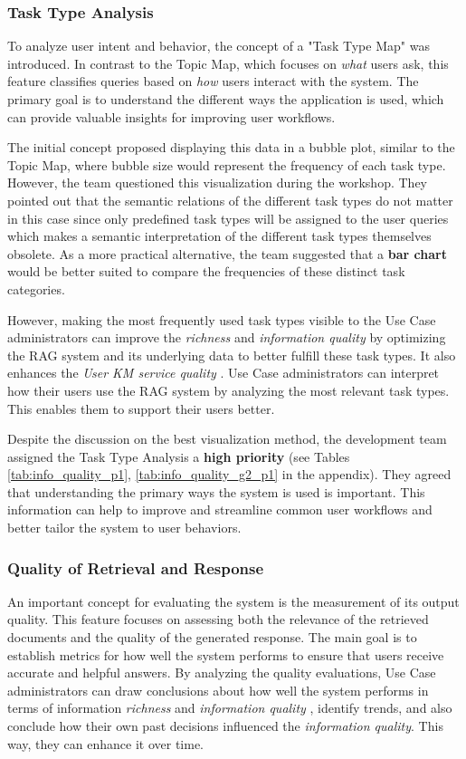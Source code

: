 \documentclass[
	english,
	ruledheaders=section,%
	class=report,%
	thesis={type=bachelor},%
	accentcolor=1b,%
	custommargins=true,%
	marginpar=false,%
	parskip=half-,%
	fontsize=11pt,%
	DIV=14,
]{tudapub}
\begin{document}
\subsubsection{Task Type Analysis}
To analyze user intent and behavior, the concept of a "Task Type Map" was introduced. In contrast to the Topic Map, which focuses on \textit{what} users ask, this feature classifies queries based on \textit{how} users interact with the system. The primary goal is to understand the different ways the application is used, which can provide valuable insights for improving user workflows.

The initial concept proposed displaying this data in a bubble plot, similar to the Topic Map, where bubble size would represent the frequency of each task type. However, the team questioned this visualization during the workshop. They pointed out that the semantic relations of the different task types do not matter in this case since only predefined task types will be assigned to the user queries which makes a semantic interpretation of the different task types themselves obsolete. As a more practical alternative, the team suggested that a \textbf{bar chart} would be better suited to compare the frequencies of these distinct task categories.

However, making the most frequently used task types visible to the Use Case administrators can improve the \textit{richness} and \textit{information quality} \parencite[pp.~57--58]{Jennex2006} by optimizing the RAG system and its underlying data to better fulfill these task types. It also enhances the \textit{User KM service quality} \parencite[pp.~58--59]{Jennex2006}. Use Case administrators can interpret how their users use the RAG system by analyzing the most relevant task types. This enables them to support their users better.

Despite the discussion on the best visualization method, the development team assigned the Task Type Analysis a \textbf{high priority} (see Tables \ref{tab:info_quality_p1}, \ref{tab:info_quality_g2_p1} in the appendix). They agreed that understanding the primary ways the system is used is important. This information can help to improve and streamline common user workflows and better tailor the system to user behaviors.
\subsubsection{Quality of Retrieval and Response}
An important concept for evaluating the system is the measurement of its output quality. This feature focuses on assessing both the relevance of the retrieved documents and the quality of the generated response. The main goal is to establish metrics for how well the system performs to ensure that users receive accurate and helpful answers. By analyzing the quality evaluations, Use Case administrators can draw conclusions about how well the system performs in terms of information \textit{richness} and \textit{information quality} \parencite[pp.~57--58]{Jennex2006}, identify trends, and also conclude how their own past decisions influenced the \textit{information quality}. This way, they can enhance it over time.
\end{document}
